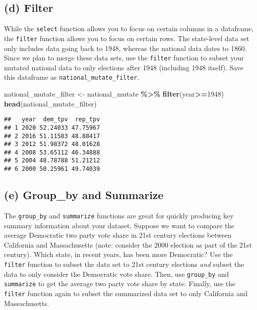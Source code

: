 \documentclass[
]{article}
\newenvironment{Shaded}{\begin{snugshade}}{\end{snugshade}}
\newcommand{\DecValTok}[1]{\textcolor[rgb]{0.00,0.00,0.81}{#1}}
\newcommand{\FunctionTok}[1]{\textcolor[rgb]{0.13,0.29,0.53}{\textbf{#1}}}
\newcommand{\NormalTok}[1]{#1}
\newcommand{\OtherTok}[1]{\textcolor[rgb]{0.56,0.35,0.01}{#1}}
\newcommand{\SpecialCharTok}[1]{\textcolor[rgb]{0.81,0.36,0.00}{\textbf{#1}}}
\begin{document}
\subsection{(d) Filter}\label{d-filter}

While the \texttt{select} function allows you to focus on certain
columns in a dataframe, the \texttt{filter} function allows you to focus
on certain rows. The state-level data set only includes data going back
to 1948, whereas the national data dates to 1860. Since we plan to merge
these data sets, use the \texttt{filter} function to subset your mutated
national data to only elections after 1948 (including 1948 itself). Save
this dataframe as \texttt{national\_mutate\_filter}.

\begin{Shaded}
\begin{Highlighting}[]
\NormalTok{national\_mutate\_filter }\OtherTok{\textless{}{-}}\NormalTok{ national\_mutate }\SpecialCharTok{\%\textgreater{}\%}
  \FunctionTok{filter}\NormalTok{(year}\SpecialCharTok{\textgreater{}=}\DecValTok{1948}\NormalTok{)}
\FunctionTok{head}\NormalTok{(national\_mutate\_filter)}
\end{Highlighting}
\end{Shaded}

\begin{verbatim}
##   year  dem_tpv  rep_tpv
## 1 2020 52.24033 47.75967
## 2 2016 51.11583 48.88417
## 3 2012 51.98372 48.01628
## 4 2008 53.65112 46.34888
## 5 2004 48.78788 51.21212
## 6 2000 50.25961 49.74039
\end{verbatim}

\subsection{(e) Group\_by and Summarize}\label{e-group_by-and-summarize}

The \texttt{group\_by} and \texttt{summarize} functions are great for
quickly producing key summary information about your dataset. Suppose we
want to compare the average Democratic two party vote share in 21st
century elections between California and Massachusetts (note: consider
the 2000 election as part of the 21st century). Which state, in recent
years, has been more Democratic? Use the \texttt{filter} function to
subset the data set to 21st century elections \emph{and} subset the data
to only consider the Democratic vote share. Then, use \texttt{group\_by}
and \texttt{summarize} to get the average two party vote share by state.
Finally, use the \texttt{filter} function again to subset the summarized
data set to only California and Massachusetts.
\end{document}
